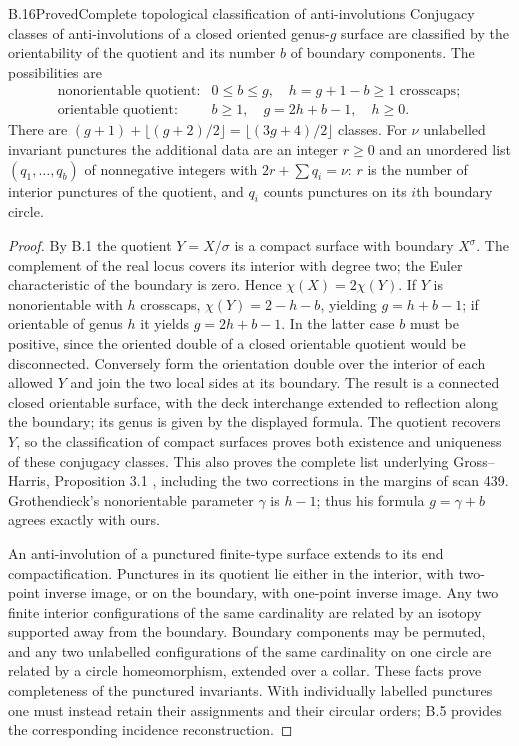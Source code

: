 \begin{claim}{B.16}{Proved}{Complete topological classification of anti-involutions}
Conjugacy classes of anti-involutions of a closed oriented genus-$g$ surface
are classified by the orientability of the quotient and its number $b$ of
boundary components. The possibilities are
\[
 \begin{array}{ll}
 \text{nonorientable quotient:}&0\le b\le g,\quad
                  h=g+1-b\ge1\text{ crosscaps};\\
 \text{orientable quotient:}&b\ge1,\quad g=2h+b-1,\quad h\ge0.
 \end{array}
\]
There are $(g+1)+\lfloor(g+2)/2\rfloor=\lfloor(3g+4)/2\rfloor$ classes.
For $\nu$ unlabelled invariant punctures the additional data are an integer
$r\ge0$ and an unordered list $(q_1,\ldots,q_b)$ of nonnegative integers with
$2r+\sum q_i=\nu$: $r$ is the number of interior punctures of the quotient,
and $q_i$ counts punctures on its $i$th boundary circle.
\end{claim}
\begin{proof}
By B.1 the quotient $Y=X/\sigma$ is a compact surface with boundary
$X^\sigma$. The complement of the real locus covers its interior with degree
two; the Euler characteristic of the boundary is zero. Hence
$\chi(X)=2\chi(Y)$. If $Y$ is nonorientable with $h$ crosscaps,
$\chi(Y)=2-h-b$, yielding $g=h+b-1$; if orientable of genus $h$ it yields
$g=2h+b-1$. In the latter case $b$ must be positive, since the oriented double
of a closed orientable quotient would be disconnected. Conversely form the
orientation double over the interior of each allowed $Y$ and join the two
local sides at its boundary. The result is a connected closed orientable surface,
with the deck interchange extended to reflection along the boundary; its genus
is given by the displayed formula. The quotient recovers $Y$, so the classification
of compact surfaces proves both existence and uniqueness of these conjugacy classes.
This also proves the complete list underlying Gross--Harris, Proposition 3.1
\cite{bGrossHarris1981}, including the two corrections in the margins of scan 439.
Grothendieck's nonorientable parameter $\gamma$ is $h-1$; thus his formula
$g=\gamma+b$ agrees exactly with ours.

An anti-involution of a punctured finite-type surface extends to its end
compactification. Punctures in its quotient lie either in the interior,
with two-point inverse image, or on the boundary, with one-point inverse image.
Any two finite interior configurations of the same cardinality are related by
an isotopy supported away from the boundary. Boundary components may be
permuted, and any two unlabelled configurations of the same cardinality on one
circle are related by a circle homeomorphism, extended over a collar. These
facts prove completeness of the punctured invariants. With individually
labelled punctures one must instead retain their assignments and their circular
orders; B.5 provides the corresponding incidence reconstruction.
\end{proof}

